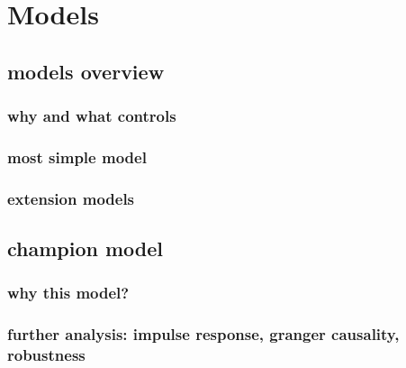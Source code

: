 \chapter{Models}\label{sec3}
\thispagestyle{empty}

\section{models overview}

\subsection{why and what controls}

\subsection{most simple model}

\subsection{extension models}

\section{champion model}

\subsection{why this model?}

\subsection{further analysis: impulse response, granger causality, robustness}

\cleardoublepage
